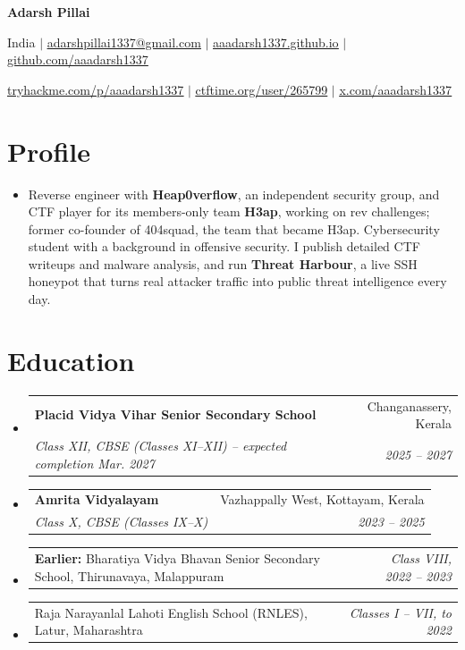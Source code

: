 \documentclass[letterpaper,11pt]{article}
\makeatletter
\newcommand{\resumeSubheading}[4]{
  \vspace{-2pt}\item
    \begin{tabular*}{\linewidth}[t]{l@{\extracolsep{\fill}}r}
      \textbf{#1} & #2 \\
      \textit{\small#3} & \textit{\small#4} \\
    \end{tabular*}\vspace{-7pt}
}
\newcommand{\resumeEntry}[2]{%
  \item
  \begin{tabular*}{\linewidth}{@{}l@{\extracolsep{\fill}}r@{}}
    #1 & \textit{\small #2} \\
  \end{tabular*}\vspace{-6pt}%
}
\newcommand{\resumeSubHeadingListStart}{\begin{itemize}[leftmargin=0.15in, label={}]}
\newcommand{\resumeSubHeadingListEnd}{\end{itemize}}
\makeatother
\begin{document}
\begin{center}
    {\Huge\bfseries Adarsh Pillai\par}
    \vspace{2pt}
    {\small
      India $|$ \href{mailto:adarshpillai1337@gmail.com}{\underline{adarshpillai1337@gmail.com}} $|$
      \href{https://aaadarsh1337.github.io/}{\underline{aaadarsh1337.github.io}} $|$
      \href{https://github.com/aaadarsh1337}{\underline{github.com/aaadarsh1337}}\par
      \vspace{2pt}
      \href{https://tryhackme.com/p/aaadarsh1337}{\underline{tryhackme.com/p/aaadarsh1337}} $|$
      \href{https://ctftime.org/user/265799}{\underline{ctftime.org/user/265799}} $|$
      \href{https://x.com/aaadarsh1337}{\underline{x.com/aaadarsh1337}}\par
    }
\end{center}


\section{Profile}
  \resumeSubHeadingListStart
    \item\small{Reverse engineer with \textbf{Heap0verflow}, an independent security group, and CTF player for its members-only team \textbf{H3ap}, working on rev challenges; former co-founder of 404squad, the team that became H3ap. Cybersecurity student with a background in offensive security. I publish detailed CTF writeups and malware analysis, and run \textbf{Threat Harbour}, a live SSH honeypot that turns real attacker traffic into public threat intelligence every day.}
  \resumeSubHeadingListEnd


\section{Education}
  \resumeSubHeadingListStart
    \resumeSubheading
      {Placid Vidya Vihar Senior Secondary School}{Changanassery, Kerala}
      {Class XII, CBSE (Classes XI--XII) -- expected completion Mar. 2027}{2025 -- 2027}
    \resumeSubheading
      {Amrita Vidyalayam}{Vazhappally West, Kottayam, Kerala}
      {Class X, CBSE (Classes IX--X)}{2023 -- 2025}
    \resumeEntry{\small\textbf{Earlier:} Bharatiya Vidya Bhavan Senior Secondary School, Thirunavaya, Malappuram}{Class VIII, 2022 -- 2023}
    \resumeEntry{\small\phantom{\textbf{Earlier:}} Raja Narayanlal Lahoti English School (RNLES), Latur, Maharashtra}{Classes I -- VII, to 2022}
  \resumeSubHeadingListEnd\vspace{4pt}
\end{document}

